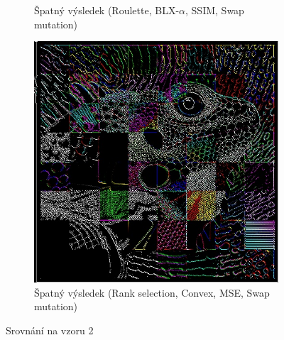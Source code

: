 \documentclass[a4paper,11pt]{scrartcl}
\begin{document}
\begin{figure}[!h]
\begin{subfigure}[b]{0.32\textwidth}
        \caption{Špatný výsledek (Roulette, BLX-$\alpha$, SSIM, Swap mutation)}
        \label{fig:ex22}
    \end{subfigure}
    \begin{subfigure}[b]{0.32\textwidth}
        \includegraphics[width=\textwidth]{img/ranksel-convex-mse-swap_example2.jpg}
        \caption{Špatný výsledek (Rank selection, Convex, MSE, Swap mutation)}
        \label{fig:ex23}
    \end{subfigure}
    \caption{Srovnání na vzoru 2}
    \label{porovnani_ex2}
\end{figure}
\end{document}
